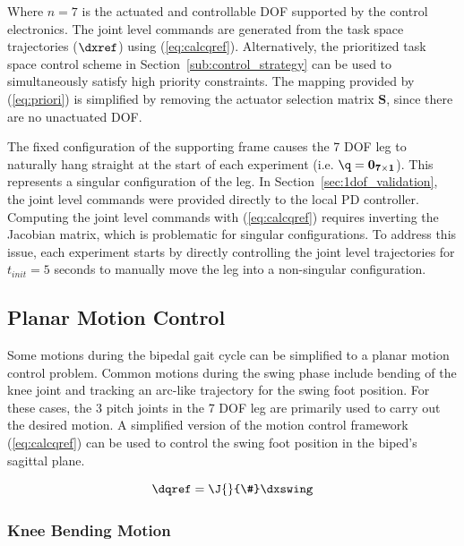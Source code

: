 Where $n = 7$ is the actuated and controllable DOF supported by the control electronics. The joint level commands are generated from the task space trajectories ($\dxref$) using (\ref{eq:calcqref}). Alternatively, the prioritized task space control scheme in Section~\ref{sub:control_strategy} can be used to simultaneously satisfy high priority constraints. The mapping provided by (\ref{eq:priori}) is simplified by removing the actuator selection matrix $\mathbf{S}$, since there are no unactuated DOF. 

The fixed configuration of the supporting frame causes the 7 DOF leg to naturally hang straight at the start of each experiment (i.e. $\q = \mathbf{0_{7 \times 1}}$). This represents a singular configuration of the leg. In Section~\ref{sec:1dof_validation}, the joint level commands were provided directly to the local PD controller. Computing the joint level commands with (\ref{eq:calcqref}) requires inverting the Jacobian matrix, which is problematic for singular configurations. To address this issue, each experiment starts by directly controlling the joint level trajectories for $t_{init} = 5$ seconds to manually move the leg into a non-singular configuration. 

\subsection{Planar Motion Control} %
\label{sub:planar_motion_control}
Some motions during the bipedal gait cycle can be simplified to a planar motion control problem. Common motions during the swing phase include bending of the knee joint and tracking an arc-like trajectory for the swing foot position. For these cases, the 3 pitch joints in the 7 DOF leg are primarily used to carry out the desired motion. A simplified version of the motion control framework (\ref{eq:calcqref}) can be used to control the swing foot position in the biped's sagittal plane.

\begin{equation}
	\dqref = \J{}{\#} \dxswing
\end{equation}

\subsubsection{Knee Bending Motion} %
\label{ssub:knee_bending_motion}

